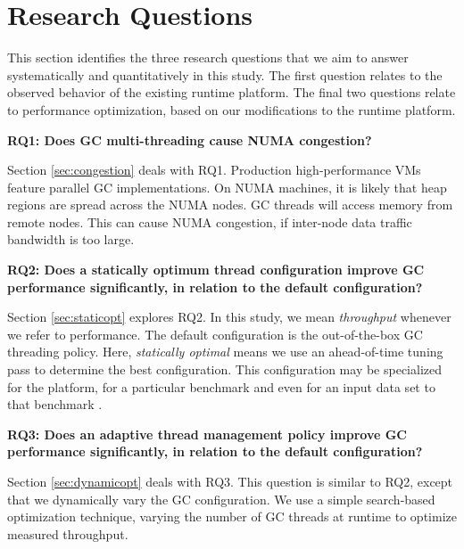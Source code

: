 \section{Research Questions}
\label{sec:rquestions}

This section identifies the three research questions 
that we aim to answer systematically and quantitatively in this
study. The first question relates to the observed behavior of the 
existing runtime platform. The final two questions relate to 
performance optimization, based on our
modifications to the runtime platform.

\textbf{RQ1: Does GC multi-threading cause NUMA congestion?}

Section \ref{sec:congestion} deals with RQ1.
Production high-performance VMs feature parallel GC implementations.
On NUMA machines, it is likely that heap regions are spread across 
the NUMA nodes. GC threads will access memory from remote nodes.
This can cause NUMA congestion, if inter-node data traffic
bandwidth is too large.

\textbf{RQ2: Does a statically optimum thread configuration improve GC performance significantly, in relation to the default configuration?}

Section \ref{sec:staticopt} explores RQ2.
In this study, we mean \emph{throughput} whenever we refer to performance.
The default configuration is the out-of-the-box GC threading policy.
Here, \emph{statically optimal} means we use an ahead-of-time tuning pass
to determine the best configuration. This configuration may be specialized
for the platform, for a particular benchmark and even for an
input data set to that benchmark \cite{mao09influence}.

\textbf{RQ3: Does an adaptive thread management policy 
improve GC performance significantly, 
in relation to the default configuration?}

Section \ref{sec:dynamicopt} deals with RQ3.
This question is similar to RQ2, except that we dynamically vary the
GC configuration. We use a simple search-based optimization technique, 
varying the number of GC threads at runtime to optimize 
measured throughput.